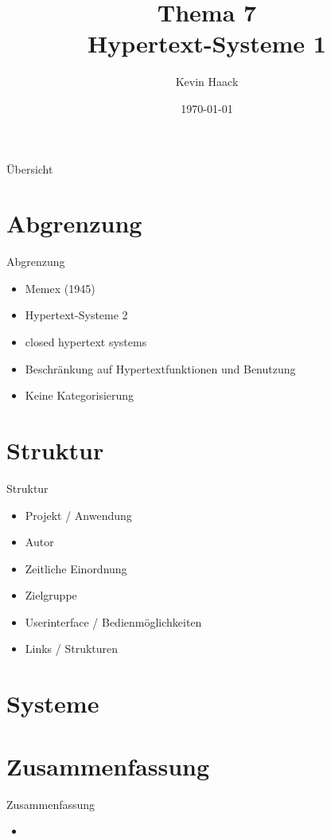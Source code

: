 \documentclass{beamer}
\title{Thema 7\\Hypertext-Systeme 1}
\author{Kevin Haack}
\institute{Universität Paderborn}
\date{\today}
\begin{document}
\begin{frame}
  \titlepage
\end{frame}

\begin{frame}{Übersicht}
\tableofcontents
\end{frame}

\section{Abgrenzung}
\begin{frame}{Abgrenzung}
	\begin{itemize}
		\item Memex (1945)
		\item Hypertext-Systeme 2
		\item closed hypertext systems
		\item Beschränkung auf Hypertextfunktionen und Benutzung
		\item Keine Kategorisierung
	\end{itemize}
\end{frame}



\section{Struktur}

\begin{frame}{Struktur}
\begin{itemize}
	\item Projekt / Anwendung
	\item Autor
	\item Zeitliche Einordnung
	\item Zielgruppe
	\item Userinterface / Bedienmöglichkeiten
	\item Links / Strukturen
\end{itemize}
\end{frame}

\section{Systeme}







%
%
%

\section{Zusammenfassung}
\begin{frame}{Zusammenfassung}
	\begin{itemize}
		\item 
	\end{itemize}
\end{frame}
\end{document}
